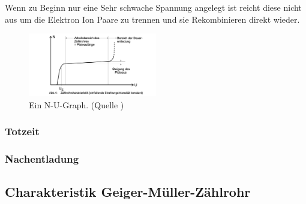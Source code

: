 Wenn zu Beginn nur eine Sehr schwache Spannung angelegt ist reicht diese nicht aus um die Elektron Ion Paare zu trennen und sie Rekombinieren direkt wieder.
\begin{figure}
    \centering
    \includegraphics[width=0.5\textwidth]{bilder/Zaehlrohr_N_U_Graph.png}
    \caption{Ein N-U-Graph. (Quelle \cite{Anleitung})}
    \label{fig:Zaehlrohr_N_U_Graph}
\end{figure}
\subsubsection{Totzeit}
\subsubsection{Nachentladung}
\label{sec:Nachentladung}
\subsection{Charakteristik Geiger-Müller-Zählrohr}
